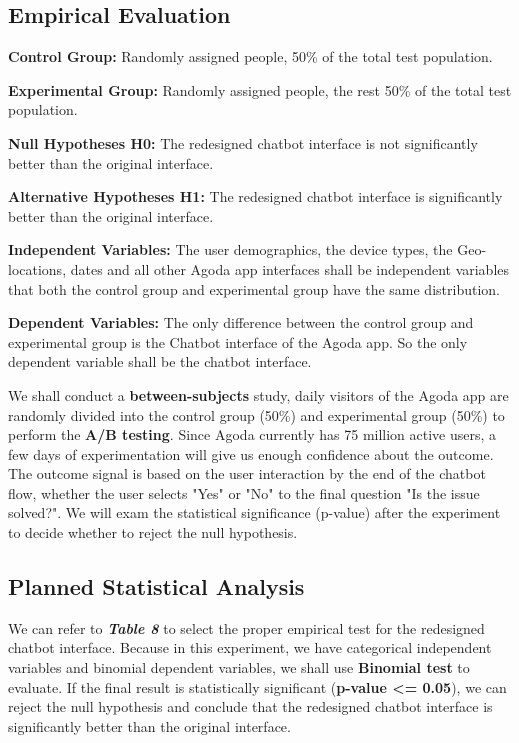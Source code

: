 \documentclass[
	letterpaper, %
]{jdf}
\begin{document}
\subsection{Empirical Evaluation}
\textbf{Control Group:} Randomly assigned people, 50\% of the total test population.

\textbf{Experimental Group:} Randomly assigned people, the rest 50\% of the total test population.

\textbf{Null Hypotheses H0:} The redesigned chatbot interface is not significantly better than the original interface.

\textbf{Alternative Hypotheses H1:} The redesigned chatbot interface is significantly better than the original interface.

\textbf{Independent Variables:} The user demographics, the device types, the Geo-locations, dates and all other Agoda app interfaces shall be independent variables that both the control group and experimental group have the same distribution.

\textbf{Dependent Variables:} The only difference between the control group and experimental group is the Chatbot interface of the Agoda app. So the only dependent variable shall be the chatbot interface.

We shall conduct a \textbf{between-subjects} study, daily visitors of the Agoda app are randomly divided into the control group (50\%) and experimental group (50\%) to perform the \textbf{A/B testing}. Since Agoda currently has 75 million active users, a few days of experimentation will give us enough confidence about the outcome. The outcome signal is based on the user interaction by the end of the chatbot flow, whether the user selects "Yes" or "No" to the final question "Is the issue solved?". We will exam the statistical significance (p-value) after the experiment to decide whether to reject the null hypothesis.

\subsection{Planned Statistical Analysis}
We can refer to \textit{\textbf{Table 8}} to select the proper empirical test for the redesigned chatbot interface. Because in this experiment, we have categorical independent variables and binomial dependent variables, we shall use \textbf{Binomial test} to evaluate. If the final result is statistically significant (\textbf{p-value <= 0.05}), we can reject the null hypothesis and conclude that the redesigned chatbot interface is significantly better than the original interface.
\end{document}
